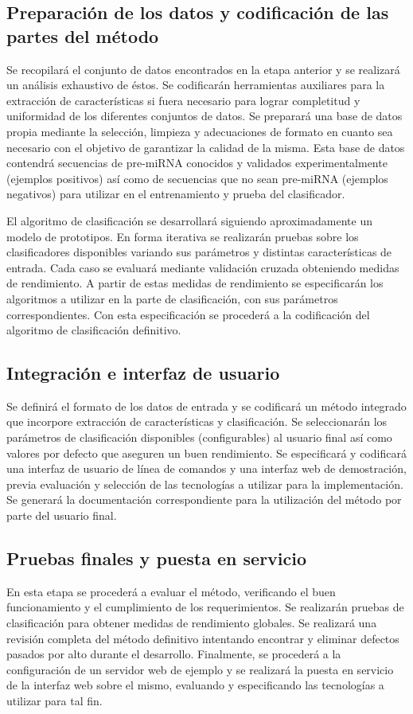 \documentclass[12pt,bibliography=oldstyle,DIV=14,parskip=full-,titlepage]{scrartcl}
\begin{document}
\subsection{Preparación de los datos y codificación de las partes del método}
Se recopilará el conjunto de datos encontrados en la etapa anterior y
se realizará un análisis exhaustivo de éstos.  Se codificarán
herramientas auxiliares para la extracción de características si fuera
necesario para lograr completitud y uniformidad de los diferentes
conjuntos de datos.  Se preparará una base de datos propia mediante la
selección, limpieza y adecuaciones de formato en cuanto sea necesario
con el objetivo de garantizar la calidad de la misma. Esta base de
datos contendrá secuencias de pre-miRNA conocidos y validados
experimentalmente (ejemplos positivos) así como de secuencias que no
sean pre-miRNA (ejemplos negativos) para utilizar en el entrenamiento
y prueba del clasificador.

El algoritmo de clasificación se desarrollará siguiendo
aproximadamente un modelo de prototipos. En forma iterativa se
realizarán pruebas sobre los clasificadores disponibles variando sus
parámetros y distintas características de entrada. Cada caso se
evaluará mediante validación cruzada obteniendo medidas de
rendimiento. A partir de estas medidas de rendimiento se especificarán
los algoritmos a utilizar en la parte de clasificación, con sus
parámetros correspondientes. Con esta especificación se procederá a la
codificación del algoritmo de clasificación definitivo.
%
\subsection{Integración e interfaz de usuario}
Se definirá el formato de los datos de entrada y se
codificará un método integrado que incorpore extracción de
características y clasificación. Se seleccionarán los parámetros de
clasificación disponibles (configurables) al usuario final así como
valores por defecto que aseguren un buen rendimiento.
%
Se especificará y codificará una interfaz de usuario de línea de
comandos y una interfaz web de demostración, previa evaluación y
selección de las tecnologías a utilizar para la implementación.  Se
generará la documentación correspondiente para la utilización del
método por parte del usuario final.
%
\subsection{Pruebas finales y puesta en servicio}
En esta etapa se procederá a evaluar el método, verificando el buen
funcionamiento y el cumplimiento de los requerimientos. Se realizarán
pruebas de clasificación para obtener medidas de rendimiento globales.
Se realizará una revisión completa del método definitivo intentando
encontrar y eliminar defectos pasados por alto durante el desarrollo.
%
Finalmente, se procederá a la configuración de un servidor web de
ejemplo y se realizará la puesta en servicio de la interfaz web sobre el
mismo, evaluando y especificando las tecnologías a utilizar para tal
fin.
%
%
\end{document}
